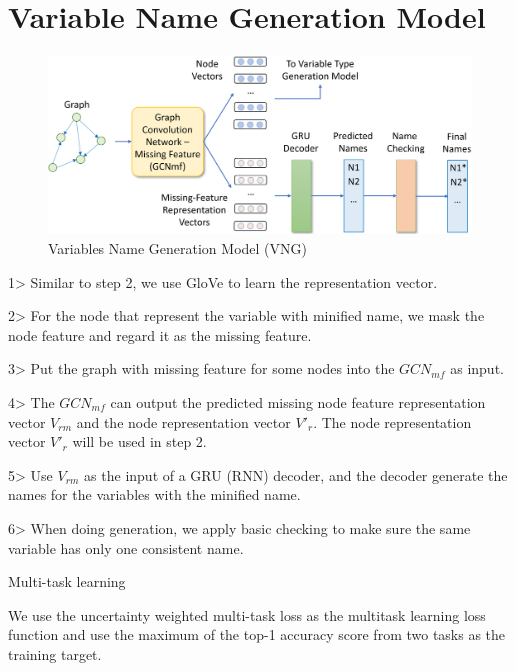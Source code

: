 \section{Variable Name Generation Model}
\label{sec:name-gen}

\begin{figure}[ht]
	\begin{center}
	  \includegraphics[width=4.8in]{figures/name-gen-model}
          \vspace{-6pt}
		\caption{Variables Name Generation Model (VNG)}
		\label{fig:name-gen}
	\end{center}
\end{figure}

1> Similar to step 2, we use GloVe to learn the representation vector.

2> For the node that represent the variable with minified name, we mask the node feature and regard it as the missing feature.

3> Put the graph with missing feature for some nodes into the $GCN_{mf}$ as input. 

4> The $GCN_{mf}$ can output the predicted missing node feature representation vector $V_{rm}$ and the node representation vector $V'_r$. The node representation vector $V'_r$ will be used in step 2.

5> Use $V_{rm}$ as the input of a GRU (RNN) decoder, and the decoder generate the names for the variables with the minified name.

6> When doing generation, we apply basic checking to make sure the same variable has only one consistent name.


Multi-task learning

We use the uncertainty weighted multi-task loss as the multitask learning loss function and use the maximum of the top-1 accuracy score from two tasks as the training target.
